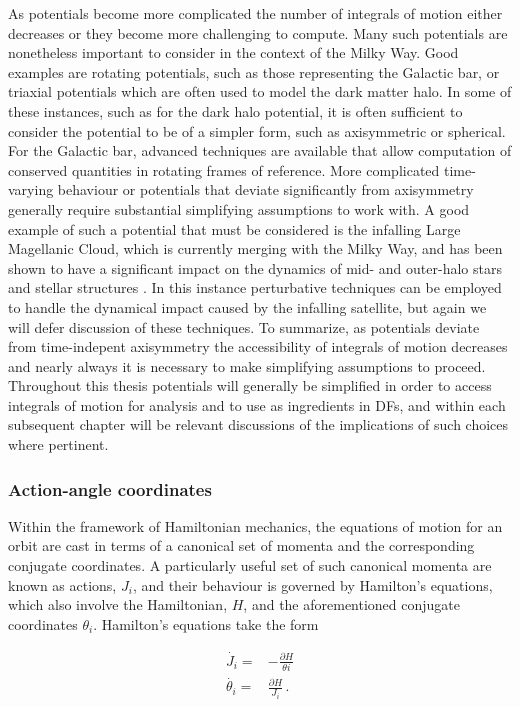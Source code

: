 As potentials become more complicated the number of integrals of motion either decreases or they become more challenging to compute. Many such potentials are nonetheless important to consider in the context of the Milky Way. Good examples are rotating potentials, such as those representing the Galactic bar, or triaxial potentials which are often used to model the dark matter halo. In some of these instances, such as for the dark halo potential, it is often sufficient to consider the potential to be of a simpler form, such as axisymmetric or spherical. For the Galactic bar, advanced techniques are available that allow computation of conserved quantities in rotating frames of reference. More complicated time-varying behaviour or potentials that deviate significantly from axisymmetry generally require substantial simplifying assumptions to work with. A good example of such a potential that must be considered is the infalling Large Magellanic Cloud, which is currently merging with the Milky Way, and has been shown to have a significant impact on the dynamics of mid- and outer-halo stars and stellar structures \parencite[e.g.][]{erkal19}. In this instance perturbative techniques can be employed to handle the dynamical impact caused by the infalling satellite, but again we will defer discussion of these techniques. To summarize, as potentials deviate from time-indepent axisymmetry the accessibility of integrals of motion decreases and nearly always it is necessary to make simplifying assumptions to proceed. Throughout this thesis potentials will generally be simplified in order to access integrals of motion for analysis and to use as ingredients in DFs, and within each subsequent chapter will be relevant discussions of the implications of such choices where pertinent.

\subsubsection{Action-angle coordinates}

Within the framework of Hamiltonian mechanics, the equations of motion for an orbit are cast in terms of a canonical set of momenta and the corresponding conjugate coordinates. A particularly useful set of such canonical momenta are known as actions, $J_{i}$, and their behaviour is governed by Hamilton's equations, which also involve the Hamiltonian, $H$, and the aforementioned conjugate coordinates $\theta_{i}$. Hamilton's equations take the form

\begin{equation}
    \label{ch1:eq:hamiltons-equations}
\begin{split}
    \dot{J_{i}}= & -\frac{\partial H}{\theta{i}} \\
    \dot{\theta_{i}} = & \frac{\partial H}{J_{i}}\,.
\end{split}
\end{equation}

